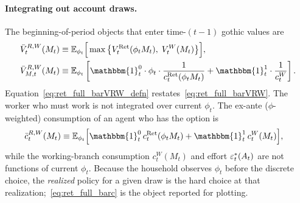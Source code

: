 \paragraph{Integrating out account draws.}
The beginning-of-period objects that enter time-$(t-1)$ gothic values are
\begin{align}
	\bar V_t^{R,W}(M_t)
	&\equiv \mathbb{E}_{\phi_t}\Big[
		\max\big\{V_t^{\Ret}(\phi_t M_t),\; V_t^{W}(M_t)\big\}
	\Big],
	\label{eq:ret_full_barVRW_defn}\\
	\bar V_{M,t}^{R,W}(M_t)
	&\equiv \mathbb{E}_{\phi_t}\left[
		\mathbbm{1}_t^{0}\cdot\phi_t\cdot\frac{1}{c_t^{\Ret}(\phi_t M_t)}
		+\mathbbm{1}_t^{1}\cdot\frac{1}{c_t^{W}}
	\right].
	\label{eq:ret_full_barVMRW}
\end{align}
Equation~\eqref{eq:ret_full_barVRW_defn} restates~\eqref{eq:ret_full_barVRW}. The worker who must work is not integrated over current $\phi_t$. The ex-ante ($\phi$-weighted) consumption of an agent who has the option is
\begin{align}
	\bar c_t^{R,W}(M_t)
	&\equiv \mathbb{E}_{\phi_t}\Big[
		\mathbbm{1}_t^{0}\,c_t^{\Ret}(\phi_t M_t)
		+\mathbbm{1}_t^{1}\,c_t^{W}(M_t)
	\Big],
	\label{eq:ret_full_barc}
\end{align}
while the working-branch consumption $c_t^{W}(M_t)$ and effort $\varepsilon_t^{\ast}(A_t)$ are not functions of current $\phi_t$. Because the household observes $\phi_t$ before the discrete choice, the \emph{realized} policy for a given draw is the hard choice at that realization;~\eqref{eq:ret_full_barc} is the object reported for plotting.

